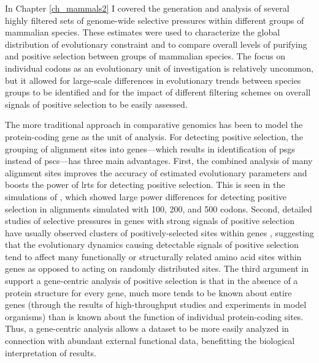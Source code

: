 In Chapter \ref{ch_mammals2} I covered the generation and analysis of
several highly filtered sets of genome-wide \sw selective pressures
within different groups of mammalian species. These \sw estimates were
used to characterize the global distribution of evolutionary
constraint and to compare overall levels of purifying and positive
selection between groups of mammalian species. The focus on individual
codons as an evolutionary unit of investigation is relatively
uncommon, but it allowed for large-scale differences in evolutionary
trends between species groups to be identified and for the impact of
different filtering schemes on overall signals of positive selection
to be easily assessed.

The more traditional approach in comparative genomics has been to
model the protein-coding gene as the unit of analysis. For detecting
positive selection, the grouping of alignment sites into genes---which
results in identification of \acp{psg} instead of \acp{psc}---has
three main advantages. First, the combined analysis of many alignment
sites improves the accuracy of estimated evolutionary parameters and
boosts the power of \acp{lrt} for detecting positive selection. This
is seen in the simulations of \citet{Anisimova2001,Anisimova2002},
which showed large power differences for detecting positive selection
in alignments simulated with 100, 200, and 500 codons. Second,
detailed studies of \sw selective pressures in genes with strong
signals of positive selection have usually observed clusters of
positively-selected sites within genes \citep{Sawyer2005a,Kosiol2008},
suggesting that the evolutionary dynamics causing detectable signals
of positive selection tend to affect many functionally or structurally
related amino acid sites within genes as opposed to acting on randomly
distributed sites. The third argument in support a gene-centric
analysis of positive selection is that in the absence of a protein
structure for every gene, much more tends to be known about entire
genes (through the results of high-throughput studies and experiments
in model organisms) than is known about the function of individual
protein-coding sites. Thus, a gene-centric analysis allows a dataset
to be more easily analyzed in connection with abundant external
functional data, benefitting the biological interpretation of results.

